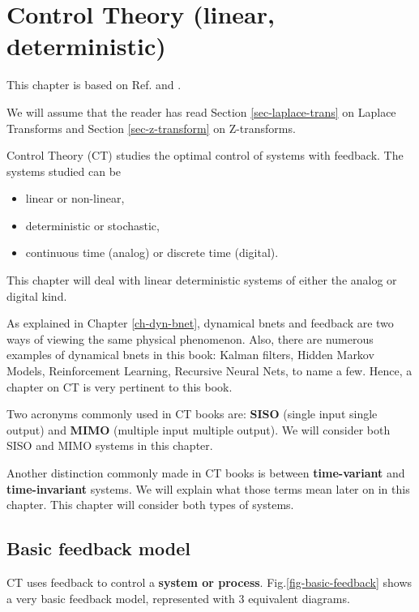 \chapter{Control Theory (linear, deterministic)}
\label{ch-control-th}

This chapter is
based on Ref.\cite{wikibooks-control-systems}
and \cite{wiki-signal-flow}.

We will assume that
the reader has read Section \ref{sec-laplace-trans}
on Laplace Transforms
and Section \ref{sec-z-transform}
on Z-transforms.

Control Theory (CT)
studies the optimal
control of systems
with feedback. 
The systems studied can
be 
\begin{itemize}
\item linear or non-linear,
\item deterministic or stochastic,
\item continuous time (analog)
or
discrete time (digital).
\end{itemize}
This chapter will deal
with linear deterministic
systems of either 
the analog or digital kind.

As explained in Chapter
\ref{ch-dyn-bnet},
dynamical bnets and feedback
are two ways
of viewing the same 
physical phenomenon.
Also, there are numerous examples
of dynamical bnets in this book:
Kalman filters, Hidden Markov Models,
Reinforcement Learning,
Recursive Neural Nets, to name a few.
Hence, a chapter 
on CT is very 
pertinent to this book.

Two acronyms
commonly 
used in CT books
are:
{\bf SISO} (single input single output)
and
{\bf MIMO} (multiple input multiple output). We will consider both
SISO and MIMO systems in this chapter.

Another distinction
commonly
made in CT books
is between {\bf time-variant}
and {\bf time-invariant } systems.
We will explain what those terms
mean later on in this chapter.
This chapter will consider
both types of systems.



\section{Basic feedback model}

CT uses feedback to
control
a {\bf system or process}.
Fig.\ref{fig-basic-feedback}
shows a very basic
feedback model,
represented
with 3 equivalent
diagrams.


